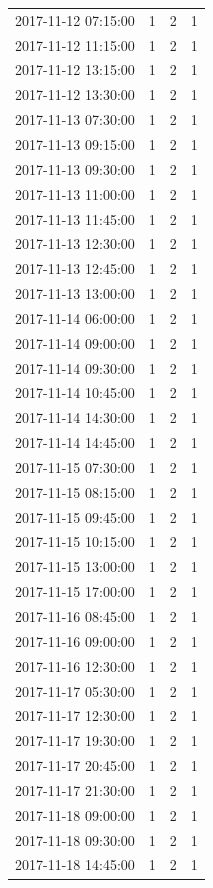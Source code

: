 \begin{tabular}{lrrr}
2017-11-12 07:15:00 & 1 & 2 & 1 \\
2017-11-12 11:15:00 & 1 & 2 & 1 \\
2017-11-12 13:15:00 & 1 & 2 & 1 \\
2017-11-12 13:30:00 & 1 & 2 & 1 \\
2017-11-13 07:30:00 & 1 & 2 & 1 \\
2017-11-13 09:15:00 & 1 & 2 & 1 \\
2017-11-13 09:30:00 & 1 & 2 & 1 \\
2017-11-13 11:00:00 & 1 & 2 & 1 \\
2017-11-13 11:45:00 & 1 & 2 & 1 \\
2017-11-13 12:30:00 & 1 & 2 & 1 \\
2017-11-13 12:45:00 & 1 & 2 & 1 \\
2017-11-13 13:00:00 & 1 & 2 & 1 \\
2017-11-14 06:00:00 & 1 & 2 & 1 \\
2017-11-14 09:00:00 & 1 & 2 & 1 \\
2017-11-14 09:30:00 & 1 & 2 & 1 \\
2017-11-14 10:45:00 & 1 & 2 & 1 \\
2017-11-14 14:30:00 & 1 & 2 & 1 \\
2017-11-14 14:45:00 & 1 & 2 & 1 \\
2017-11-15 07:30:00 & 1 & 2 & 1 \\
2017-11-15 08:15:00 & 1 & 2 & 1 \\
2017-11-15 09:45:00 & 1 & 2 & 1 \\
2017-11-15 10:15:00 & 1 & 2 & 1 \\
2017-11-15 13:00:00 & 1 & 2 & 1 \\
2017-11-15 17:00:00 & 1 & 2 & 1 \\
2017-11-16 08:45:00 & 1 & 2 & 1 \\
2017-11-16 09:00:00 & 1 & 2 & 1 \\
2017-11-16 12:30:00 & 1 & 2 & 1 \\
2017-11-17 05:30:00 & 1 & 2 & 1 \\
2017-11-17 12:30:00 & 1 & 2 & 1 \\
2017-11-17 19:30:00 & 1 & 2 & 1 \\
2017-11-17 20:45:00 & 1 & 2 & 1 \\
2017-11-17 21:30:00 & 1 & 2 & 1 \\
2017-11-18 09:00:00 & 1 & 2 & 1 \\
2017-11-18 09:30:00 & 1 & 2 & 1 \\
2017-11-18 14:45:00 & 1 & 2 & 1 \\

\end{tabular}
